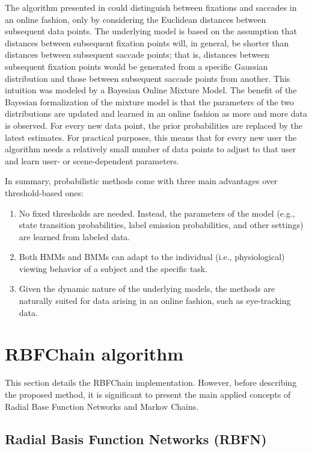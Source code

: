 \documentclass[preprint,12pt]{elsarticle}
\begin{document}
The algorithm presented in \cite{Tafaj:2012:BOC:2168556.2168617} could distinguish between fixations and saccades in an online fashion,
only by considering the Euclidean distances between subsequent data points.
The underlying model is based on the assumption
that distances between subsequent fixation points will, in general, be shorter than distances between subsequent saccade points;
that is, distances between subsequent fixation points would be generated from a specific Gaussian distribution and those between subsequent saccade points from another.
This intuition was modeled by a Bayesian Online Mixture Model.
The benefit of the Bayesian formalization of the mixture model
is that the parameters of the two distributions are updated and learned in an online fashion as more and more data is observed.
For every new data point, the prior probabilities are replaced by the latest estimates.
For practical purposes, this means that for every new user the algorithm needs a relatively small number of data points to
adjust to that user and learn user- or scene-dependent parameters.

In summary, probabilistic methods come with three main advantages over threshold-based ones:

\begin{enumerate}
    \item No fixed thresholds are needed. Instead, the parameters of the model (e.g., state transition probabilities, label emission probabilities, and other settings) are learned from labeled data.
    \item Both HMMs and BMMs can adapt to the individual (i.e., physiological) viewing behavior of a subject and the specific task.
    \item Given the dynamic nature of the underlying models, the methods are naturally suited for data arising in an online fashion, such as eye-tracking data.
\end{enumerate}

\section{RBFChain algorithm}
\label{sec:rbfchain_algorithm}

This section details the RBFChain implementation. However, before describing the proposed method, it is significant to present the main applied concepts of Radial Base Function Networks and Markov Chains.

\subsection{Radial Basis Function Networks (RBFN)}
\end{document}
